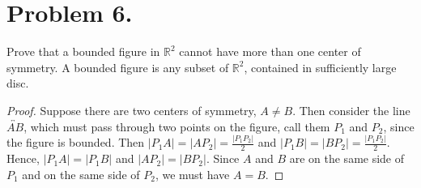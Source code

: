 \documentclass{article}
\begin{document}
\section{Problem 6.}
Prove that a bounded figure in $\mathbb{R}^2$ cannot have more than one center of symmetry. A bounded figure is any subset of $\mathbb{R}^2$, contained in sufficiently large disc.
\begin{proof}
Suppose there are two centers of symmetry, $A\neq B$. Then consider the line $\overleftrightarrow{AB}$, which must pass through two points on the figure, call them $P_1$ and $P_2$, since the figure is bounded. Then $|P_1A|=|AP_2|=\frac{|P_1P_2|}{2}$ and $|P_1B|=|BP_2|=\frac{|P_1P_2|}{2}$. Hence, $|P_1A|=|P_1B|$ and $|AP_2|=|BP_2|$. Since $A$ and $B$ are on the same side of $P_1$ and on the same side of $P_2$, we must have $A=B$.
\end{proof}
\end{document}
